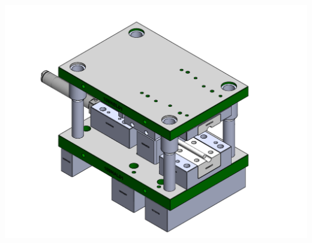 

\begin{center}
\includegraphics[scale=0.35]{src/ch3/troquel.pdf}
\label{fig:troquel}
\end{center}

